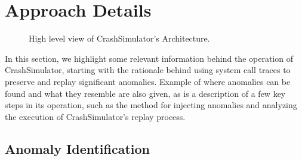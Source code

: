 \section{Approach Details}
\label{sec:approach}
    \begin{figure}[t]
        \center{}
        \caption{High level view of CrashSimulator's Architecture.}
        \label{figure:architecture}
    \end{figure}

      In this section, we highlight some relevant
    information behind the operation of CrashSimulator, starting with the
    rationale behind using system call traces to preserve and replay significant
    anomalies. Example of where anomalies can be found and what they resemble
    are also given, as is a description of a few key steps in its operation,
    such as the method for injecting anomalies and analyzing the execution of
    CrashSimulator’s replay process.


    \subsection{Anomaly Identification}
    
